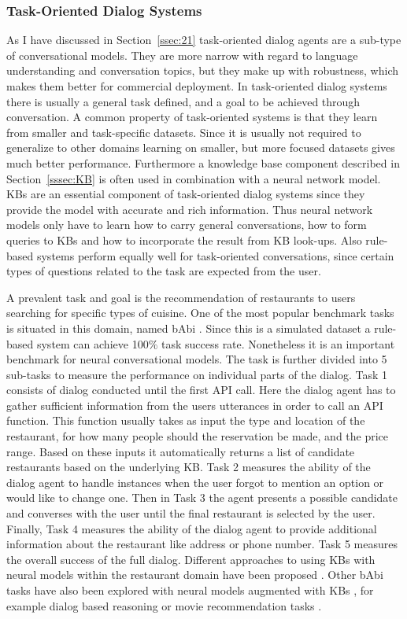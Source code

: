 \documentclass[12pt]{article}
\begin{document}
\subsubsection{Task-Oriented Dialog Systems} \label{sssec:task}
As I have discussed in Section~\ref{ssec:21} task-oriented dialog agents are a sub-type of conversational models. They are more narrow with regard to language understanding and conversation topics, but they make up with robustness, which makes them better for commercial deployment. In task-oriented dialog systems there is usually a general task defined, and a goal to be achieved through conversation. A common property of task-oriented systems is that they learn from smaller and task-specific datasets. Since it is usually not required to generalize to other domains learning on smaller, but more focused datasets gives much better performance. Furthermore a knowledge base component described in Section~\ref{sssec:KB} is often used in combination with a neural network model. KBs are an essential component of task-oriented dialog systems since they provide the model with accurate and rich information. Thus neural network models only have to learn how to carry general conversations, how to form queries to KBs and how to incorporate the result from KB look-ups. Also rule-based systems perform equally well for task-oriented conversations, since certain types of questions related to the task are expected from the user.

A prevalent task and goal is the recommendation of restaurants to users searching for specific types of cuisine. One of the most popular benchmark tasks is situated in this domain, named bAbi \cite{Bordes:2016,Joshi:2017,bAbi}. Since this is a simulated dataset a rule-based system can achieve 100\(\%\) task success rate. Nonetheless it is an important benchmark for neural conversational models. The task is further divided into 5 sub-tasks to measure the performance on individual parts of the dialog. Task 1 consists of dialog conducted until the first API call. Here the dialog agent has to gather sufficient information from the users utterances in order to call an API function. This function usually takes as input the type and location of the restaurant, for how many people should the reservation be made, and the price range. Based on these inputs it automatically returns a list of candidate restaurants based on the underlying KB. Task 2 measures the ability of the dialog agent to handle instances when the user forgot to mention an option or would like to change one. Then in Task 3 the agent presents a possible candidate and converses with the user until the final restaurant is selected by the user. Finally, Task 4 measures the ability of the dialog agent to provide additional information about the restaurant like address or phone number. Task 5 measures the overall success of the full dialog. Different approaches to using KBs with neural models within the restaurant domain have been proposed \cite{Wen:2016,Eric:2017,Williams:2017}. Other bAbi tasks have also been explored with neural models augmented with KBs \cite{Williams:2017,Li_HIL:2016}, for example dialog based reasoning \cite{Weston:2015} or movie recommendation tasks \cite{Miller:2016,Dodge:2015}.
\end{document}
